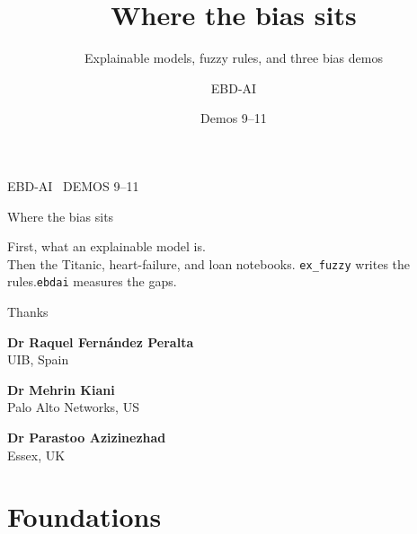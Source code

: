 \documentclass[aspectratio=169,11pt]{beamer}
\title{Where the bias sits}
\subtitle{Explainable models, fuzzy rules, and three bias demos}
\author{EBD-AI}
\date{Demos 9--11}
\institute{}
\begin{document}

\begin{frame}
  \vspace{0.6em}
  {\color{ebdgreen}\scriptsize EBD-AI \textperiodcentered\ DEMOS 9--11}
  \par\vspace{0.7em}
  {\Huge Where the bias sits\par}
  \vspace{0.7em}
  {\large First, what an explainable model is.\\[0.25em]
  Then the Titanic, heart-failure, and loan notebooks.}
  \vfill
  {\color{ebdmuted}\small\texttt{ex\_fuzzy} writes the rules.\quad\texttt{ebdai} measures the gaps.}
\end{frame}


\begin{frame}
  \vspace{0.35em}
  {Thanks\par}
  \vspace{0.15em}
  {\large
  \textbf{Dr Raquel Fern\'andez Peralta}\\[0.2em]
  {\normalsize\color{ebdmuted}UIB, Spain}

  \vspace{0.85em}
  \textbf{Dr Mehrin Kiani}\\[0.2em]
  {\normalsize\color{ebdmuted}Palo Alto Networks, US}

  \vspace{0.85em}
  \textbf{Dr Parastoo Azizinezhad}\\[0.2em]
  {\normalsize\color{ebdmuted}Essex, UK}}
\end{frame}

\section{Foundations}
\end{document}
